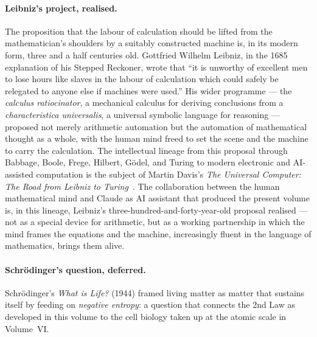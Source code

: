 \paragraph{Leibniz's project, realised.}
The proposition that the labour of calculation should be lifted from the mathematician's shoulders by a suitably constructed machine is, in its modern form, three and a half centuries old. Gottfried Wilhelm Leibniz, in the 1685 explanation of his Stepped Reckoner, wrote that ``it is unworthy of excellent men to lose hours like slaves in the labour of calculation which could safely be relegated to anyone else if machines were used.'' His wider programme --- the \emph{calculus ratiocinator}, a mechanical calculus for deriving conclusions from a \emph{characteristica universalis}, a universal symbolic language for reasoning --- proposed not merely arithmetic automation but the automation of mathematical thought as a whole, with the human mind freed to set the scene and the machine to carry the calculation. The intellectual lineage from this proposal through Babbage, Boole, Frege, Hilbert, G\"odel, and Turing to modern electronic and AI-assisted computation is the subject of Martin Davis's \emph{The Universal Computer: The Road from Leibniz to Turing}~\cite{Davis2000}. The collaboration between the human mathematical mind and Claude as AI assistant that produced the present volume is, in this lineage, Leibniz's three-hundred-and-forty-year-old proposal realised --- not as a special device for arithmetic, but as a working partnership in which the mind frames the equations and the machine, increasingly fluent in the language of mathematics, brings them alive.

\paragraph{Schr\"odinger's question, deferred.}
Schr\"odinger's \emph{What is Life?} (1944) framed living matter as
matter that sustains itself by feeding on \emph{negative entropy}: a
question that connects the 2nd Law as developed in this volume to the
cell biology taken up at the atomic scale in Volume~VI.


